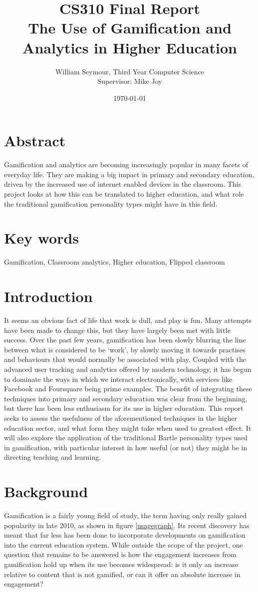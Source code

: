 \documentclass{article}
\title{CS310 Final Report \\ The Use of Gamification and Analytics in Higher Education}
\author{William Seymour, Third Year Computer Science \\ Supervisor: Mike Joy}
\date{\today}
\begin{document}
\maketitle
\clearpage
\tableofcontents

\section{Abstract}
Gamification and analytics are becoming increasingly popular in many facets of everyday life. They are making a big impact in primary and secondary education, driven by the increased use of internet enabled devices in the classroom. This project looks at how this can be translated to higher education, and what role the traditional gamification personality types might have in this field.

\section{Key words}
Gamification, Classroom analytics, Higher education, Flipped classroom

\section{Introduction}
It seems an obvious fact of life that work is dull, and play is fun. Many attempts have been made to change this, but they have largely been met with little success. Over the past few years, gamification has been slowly blurring the line between what is considered to be `work', by slowly moving it towards practises and behaviours that would normally be associated with play. Coupled with the advanced user tracking and analytics offered by modern technology, it has begun to dominate the ways in which we interact electronically, with services like Facebook and Foursquare being prime examples. The benefit of integrating these techniques into primary and secondary education was clear from the beginning, but there has been less enthusiasm for its use in higher education. This report seeks to assess the usefulness of the aforementioned techniques in the higher education sector, and what form they might take when used to greatest effect. It will also explore the application of the traditional Bartle personality types used in gamification, with particular interest in how useful (or not) they might be in directing teaching and learning.

\section{Background}
Gamification is a fairly young field of study, the term having only really gained popularity in late 2010, as shown in figure \ref{usagegraph}. Its recent discovery has meant that far less has been done to incorporate developments on gamification into the current education system. While outside the scope of the project, one question that remains to be answered is how the engagement increases from gamification hold up when its use becomes widespread: is it only an increase relative to content that is not gamified, or can it offer an absolute increase in engagement?
\end{document}
